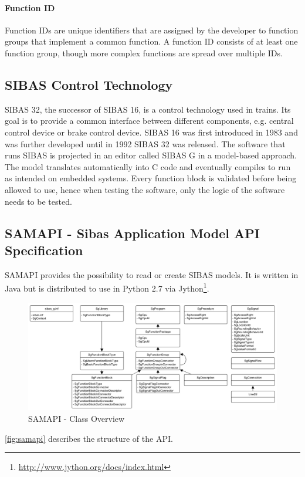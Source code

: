 \paragraph{Function ID} Function IDs are unique identifiers that are assigned by the developer to function groups that implement a common function. A function ID consists of at least one function group, though more complex functions are spread over multiple IDs.

\subsection{SIBAS Control Technology}

SIBAS 32, the successor of SIBAS 16, is a control technology used in trains. Its goal is to provide a common interface between different components, e.g. central control device or brake control device. SIBAS 16 was first introduced in 1983 and was further developed until in 1992 SIBAS 32 was released. The software that runs SIBAS is projected in an editor called SIBAS G in a model-based approach. The model translates automatically into C code and eventually compiles to run as intended on embedded systems. Every function block is validated before being allowed to use, hence when testing the software, only the logic of the software needs to be tested.


\subsection{SAMAPI - Sibas Application Model API Specification}

SAMAPI provides the possibility to read or create SIBAS models.
It is written in Java but is distributed to use in Python 2.7 via Jython\footnote{\url{http://www.jython.org/docs/index.html}}.

\begin{figure}[ht]
	\centering
	\includegraphics[width=1\textwidth]{graphic/samapi_classes.png}
	\caption{SAMAPI - Class Overview}
	\label{fig:samapi}
\end{figure}

\autoref{fig:samapi} describes the structure of the API.




